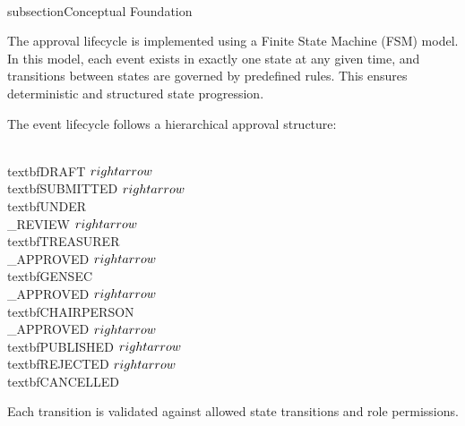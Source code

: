 \\subsection{Conceptual Foundation}

The approval lifecycle is implemented using a Finite State Machine (FSM) model. In this model, each event exists in exactly one state at any given time, and transitions between states are governed by predefined rules. This ensures deterministic and structured state progression.

The event lifecycle follows a hierarchical approval structure:

\\textbf{DRAFT} $\\rightarrow$ \\textbf{SUBMITTED} $\\rightarrow$ \\textbf{UNDER\\_REVIEW} $\\rightarrow$ \\textbf{TREASURER\\_APPROVED} $\\rightarrow$ \\textbf{GENSEC\\_APPROVED} $\\rightarrow$ \\textbf{CHAIRPERSON\\_APPROVED} $\\rightarrow$ \\textbf{PUBLISHED} $\\rightarrow$ \\textbf{REJECTED} $\\rightarrow$ \\textbf{CANCELLED}

Each transition is validated against allowed state transitions and role permissions.

